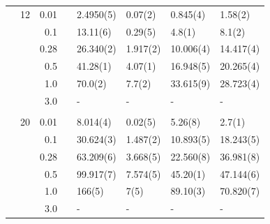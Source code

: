 \begin{table}
\begin{tabularx}{\textwidth}{R{1.5cm}rrcR{2.3cm}R{2.3cm}R{2.3cm}R{2.3cm}}
		&12 & 0.01 && 2.4950(5) & 0.07(2) & 0.845(4) & 1.58(2) \\
		&& 0.1 && 13.11(6) & 0.29(5) & 4.8(1) & 8.1(2) \\
		&& 0.28 && 26.340(2) & 1.917(2) & 10.006(4) & 14.417(4) \\
		&& 0.5 && 41.28(1) & 4.07(1) & 16.948(5) & 20.265(4) \\
		&& 1.0 && 70.0(2) & 7.7(2) & 33.615(9) & 28.723(4) \\
		&& 3.0 && - & - & - & - \\ \hdashline \\
		
		&20 & 0.01 && 8.014(4) & 0.02(5) & 5.26(8) & 2.7(1) \\
		&& 0.1 && 30.624(3) & 1.487(2) & 10.893(5) & 18.243(5) \\
		&& 0.28 && 63.209(6) & 3.668(5) & 22.560(8) & 36.981(8) \\
		&& 0.5 && 99.917(7) & 7.574(5) & 45.20(1) & 47.144(6) \\
		&& 1.0 && 166(5) & 7(5) & 89.10(3) & 70.820(7) \\
		&& 3.0 && - & - & - & - \\ \hline \hline
	\end{tabularx}
\end{table} 


